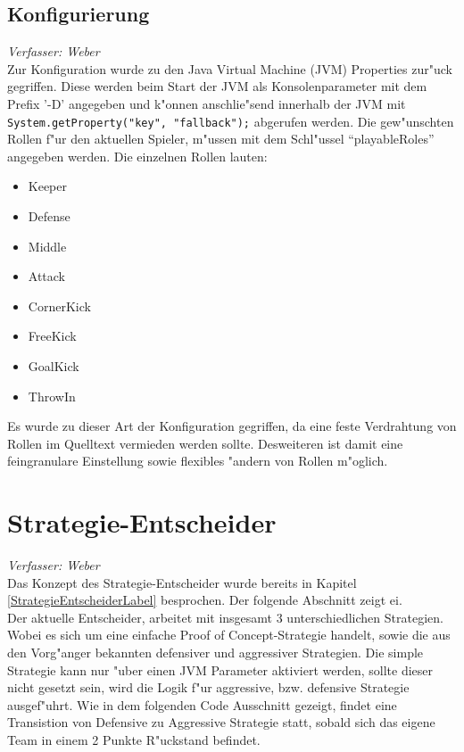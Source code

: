 \documentclass[fontsize=12pt,a4paper,final]{scrartcl}[2003/01/01]
\begin{document}
\subsection{Konfigurierung}
\textit{Verfasser: Weber}\\
Zur Konfiguration wurde zu den Java Virtual Machine (JVM) Properties zur"uck gegriffen. Diese werden beim Start der JVM als Konsolenparameter mit dem Prefix '-D' angegeben und k"onnen anschlie"send innerhalb der JVM mit \lstinline$System.getProperty("key", "fallback");$ abgerufen werden. Die gew"unschten Rollen f"ur den aktuellen Spieler, m"ussen mit dem Schl"ussel ``playableRoles'' angegeben werden. Die einzelnen Rollen lauten:

\begin{itemize}
\item Keeper
\item Defense
\item Middle
\item Attack
\item CornerKick
\item FreeKick
\item GoalKick
\item ThrowIn
\end{itemize}

Es wurde zu dieser Art der Konfiguration gegriffen, da eine feste Verdrahtung von Rollen im Quelltext vermieden werden sollte. Desweiteren ist damit eine feingranulare Einstellung sowie flexibles "andern von Rollen m"oglich.

\section{Strategie-Entscheider}
\textit{Verfasser: Weber}\\
Das Konzept des Strategie-Entscheider wurde bereits in Kapitel \ref{StrategieEntscheiderLabel} besprochen. Der folgende Abschnitt zeigt ei.\\
Der aktuelle Entscheider, arbeitet mit insgesamt 3 unterschiedlichen Strategien. Wobei es sich um eine einfache Proof of Concept-Strategie handelt, sowie die aus den Vorg"anger bekannten defensiver und aggressiver Strategien. Die simple Strategie kann nur "uber einen JVM Parameter aktiviert werden, sollte dieser nicht gesetzt sein, wird die Logik f"ur aggressive, bzw. defensive Strategie ausgef"uhrt. Wie in dem folgenden Code Ausschnitt gezeigt, findet eine Transistion von Defensive zu Aggressive Strategie statt, sobald sich das eigene Team in einem 2 Punkte R"uckstand befindet.
\end{document}
